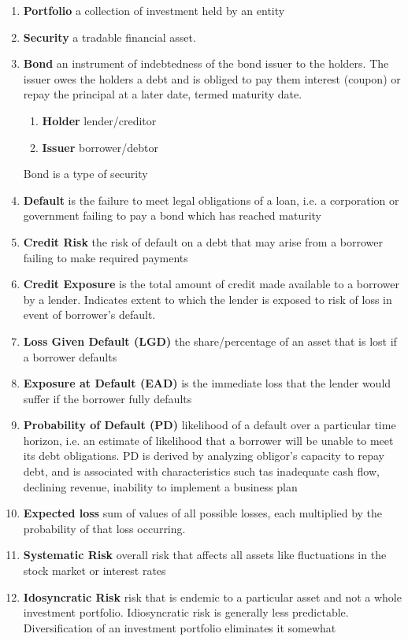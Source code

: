 \documentclass[11pt]{article}
\begin{document}
\begin{enumerate}
    \item \textbf{Portfolio} a collection of investment held by an entity
    \item \textbf{Security} a tradable financial asset.
    \item \textbf{Bond} an instrument of indebtedness of the bond issuer to the holders. The issuer owes the holders a debt and is obliged to pay them interest (coupon) or repay the principal at a later date, termed maturity date.
    \begin{enumerate}
        \item \textbf{Holder} lender/creditor 
        \item \textbf{Issuer} borrower/debtor
    \end{enumerate}
    Bond is a type of security
    \item \textbf{Default} is the failure to meet legal obligations of a loan, i.e. a corporation or government failing to pay a bond which has reached maturity
    \item \textbf{Credit Risk} the risk of default on a debt that may arise from a borrower failing to make required payments 
    \item \textbf{Credit Exposure} is the total amount of credit made available to a borrower by a lender. Indicates extent to which the lender is exposed to risk of loss in event of borrower's default. 
    \item \textbf{Loss Given Default (LGD)} the share/percentage of an asset that is lost if a borrower defaults
    \item \textbf{Exposure at Default (EAD)} is the immediate loss that the lender would suffer if the borrower fully defaults
    \item \textbf{Probability of Default (PD)} likelihood of a default over a particular time horizon, i.e. an estimate of likelihood that a borrower will be unable to meet its debt obligations. PD is derived by analyzing obligor's capacity to repay debt, and is associated with characteristics such tas inadequate cash flow, declining revenue, inability to implement a business plan
    \item \textbf{Expected loss} sum of values of all possible losses, each multiplied by the probability of that loss occurring.
    \item \textbf{Systematic Risk} overall risk that affects all assets like fluctuations in the stock market or interest rates
    \item \textbf{Idosyncratic Risk} risk that is endemic to a particular asset and not a whole investment portfolio. Idiosyncratic risk is generally less predictable. Diversification of an investment portfolio eliminates it somewhat
\end{enumerate}
\end{document}
